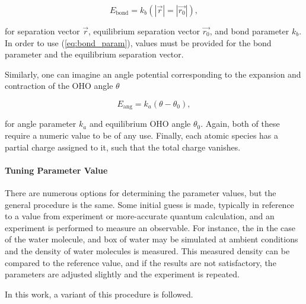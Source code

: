         \begin{equation}
        \label{eq:bond_param}
            E_\text{bond} = k_b(|\vec{r}|=|\vec{r_0}|),
        \end{equation}
        
        \noindent for separation vector $\vec{r}$, equilibrium separation vector $\vec{r_0}$, and bond parameter $k_b$. In order to use (\ref{eq:bond_param}), values must be provided for the bond parameter and the equilibrium separation vector.
        
        Similarly, one can imagine an angle potential corresponding to the expansion and contraction of the OHO angle $\theta$
        
        \begin{equation}
            E_\text{ang} = k_a(\theta - \theta_0),
        \end{equation}
        
        \noindent for angle parameter $k_a$ and equilibrium OHO angle $\theta_0$. Again, both of these require a numeric value to be of any use. Finally, each atomic species has a partial charge assigned to it, such that the total charge vanishes.
        
        \paragraph{Tuning Parameter Value} There are numerous options for determining the parameter values, but the general procedure is the same. Some initial guess is made, typically in reference to a value from experiment or more-accurate quantum calculation, and an experiment is performed to measure an observable. For instance, the in the case of the water molecule, and box of water may be simulated at ambient conditions and the density of water molecules is measured. This measured density can be compared to the reference value, and if the results are not satisfactory, the parameters are adjusted slightly and the experiment is repeated.
        
        In this work, a variant of this procedure is followed.
